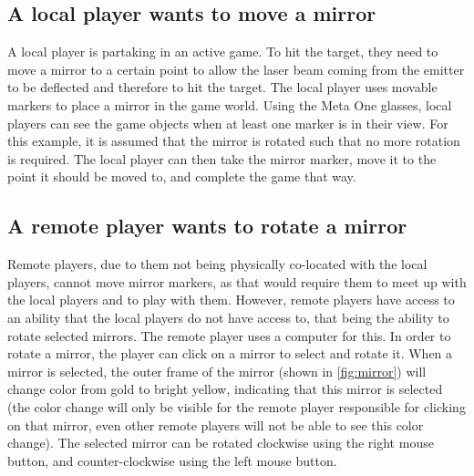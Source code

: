 		\subsection{A local player wants to move a mirror} \label{ssec:localmovemirror}
			A local player is partaking in an active game. To hit the target, 
			they need to move a mirror to a certain point to allow the laser 
			beam coming from the emitter to be deflected and therefore to hit 
			the target. The local player uses movable markers to place a mirror 
			in the game world. Using the Meta One glasses, local players can see
			the game objects when at least one marker is in their view. For this
			example, it is assumed that the mirror is rotated such that no more 
			rotation is required. The local player can then take the mirror 
			marker, move it to the point it should be moved to, and complete the
			game that way.
			
		\subsection{A remote player wants to rotate a mirror} \label{ssec:remoterotatemirror}
			Remote players, due to them not being physically co-located with the
			local players, cannot move mirror markers, as that would require them
			to meet up with the local players and to play with them. However, 
			remote players have access to an ability that the local players do
			not have access to, that being the ability to rotate selected mirrors.
			The remote player uses a computer for this. In order to rotate a mirror,
			the player can click on a mirror to select and rotate it. When a mirror 
			is selected, the outer frame of the mirror (shown in \ref{fig:mirror}) 
			will change color from gold to bright yellow, indicating that this mirror 
			is selected (the color change will only be visible for the remote player 
			responsible for clicking on that mirror, even other remote players will not 
			be able to see this color change). The selected mirror can be rotated clockwise
			using the right mouse button, and counter-clockwise using the left mouse button. 
			
